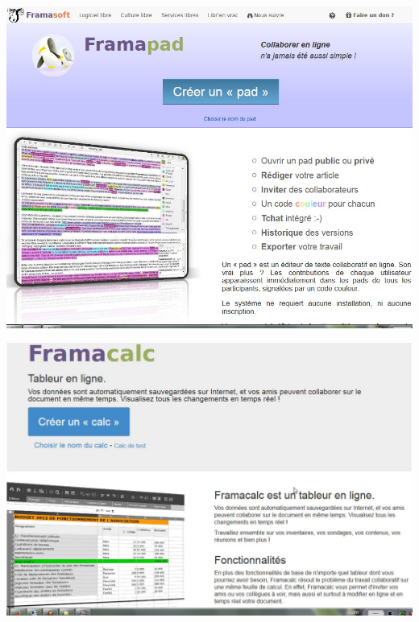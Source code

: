 \documentclass{beamer}
\begin{document}
\begin{frame}
\begin{center}
\includegraphics[scale=0.4]{./images/Framapad.jpg}
\end{center}
\end{frame}

\begin{frame}
\begin{center}
\includegraphics[scale=0.4]{./images/FramaCalc.jpg}
\end{center}
\end{frame}
\end{document}
